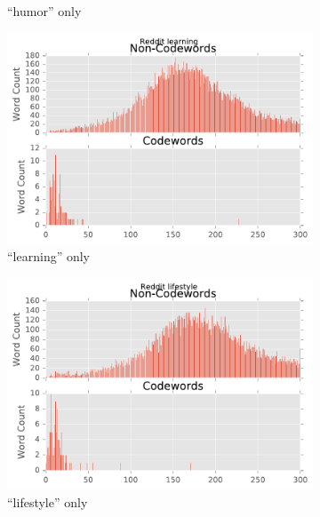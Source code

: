 \begin{figure}[H]
\begin{subfigure}[t]{.4\textwidth}
\caption{``humor'' only}
\label{fig-reddit-humor-only-count}
\end{subfigure}
\begin{subfigure}[t]{.4\textwidth}
\centering\includegraphics[]{figures/reddit-learning-only-count.pdf}
\caption{``learning'' only}
\label{fig-reddit-learning-only-count}
\end{subfigure}
\begin{subfigure}[t]{.4\textwidth}
\centering\includegraphics[]{figures/reddit-lifestyle-only-count.pdf}
\caption{``lifestyle'' only}
\label{fig-reddit-lifestyle-only-count}
\end{subfigure}
\begin{subfigure}[t]{.4\textwidth}

\end{subfigure}
\end{figure}

